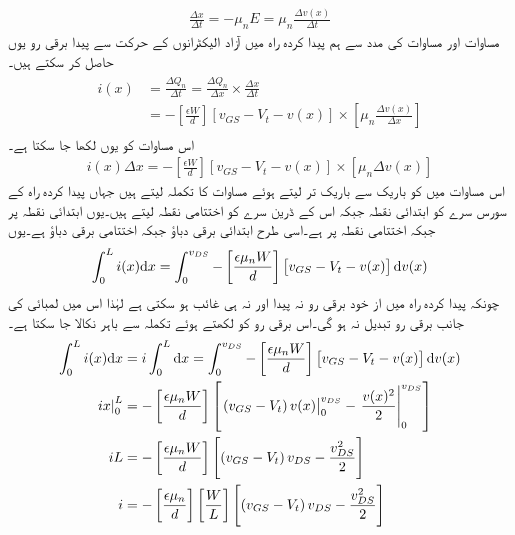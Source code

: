 \begin{align} \label{مساوات_میدانی_الیکٹران_کی_رفتار}
\frac{\Delta x}{\Delta t}=-\mu_n E=\mu_n \frac{\Delta v(x)}{\Delta t}
\end{align}
مساوات   اور مساوات   کی مدد سے ہم پیدا کردہ راہ میں آزاد الیکٹرانوں کے حرکت سے پیدا برقی رو یوں حاصل کر سکتے ہیں۔
\begin{gather}
\begin{aligned}
i(x)&=\frac{\Delta Q_n}{\Delta t}=\frac{\Delta Q_n}{\Delta x} \times \frac{\Delta x}{\Delta t}\\
&=-\left[\frac{\epsilon W}{d} \right ] \left[v_{GS}-V_t-v(x) \right ] \times \left [\mu_n \frac{\Delta v(x)}{\Delta x} \right ]
\end{aligned}
\end{gather}
اس مساوات کو یوں لکھا جا سکتا ہے۔
\begin{align}
i(x) \Delta x=-\left[\frac{\epsilon W}{d} \right ] \left[v_{GS}-V_t -v(x) \right] \times \left[\mu_n \Delta v(x) \right ]
\end{align}
اس مساوات میں  کو باریک سے باریک تر لیتے ہوئے مساوات کا تکملہ لیتے ہیں جہاں پیدا کردہ راہ کے سورس سرے کو ابتدائی نقطہ جبکہ اس کے ڈرین سرے کو اختتامی نقطہ لیتے ہیں۔یوں ابتدائی نقطہ پر    جبکہ اختتامی نقطہ پر   ہے۔اسی طرح ابتدائی برقی دباؤ   جبکہ اختتامی برقی دباؤ   ہے۔یوں
\begin{align}
\int_0^{L} {i(x)} \textup{d}x=\int_0^{v_{DS}}-\left[\frac{\epsilon \mu_n W}{d} \right ] \left[v_{GS}-V_t-v(x) \right ] \textup{d}v(x)
\end{align}
چونکہ پیدا کردہ راہ میں از خود برقی رو نہ پیدا اور نہ ہی غائب ہو سکتی ہے لہٰذا اس میں لمبائی کی جانب برقی رو تبدیل نہ ہو گی۔اس برقی رو کو  لکھتے ہوئے تکملہ سے باہر نکالا جا سکتا ہے۔
\begin{gather}
\begin{aligned}
\int_0^{L} {i(x) \textup{d}x}&=i \int_0^{L} {\textup{d}x}=\int_0^{v_{DS}}-\left[\frac{\epsilon \mu_n W}{d} \right ] \left[v_{GS}-V_t-v(x) \right ] \textup{d}v(x)\\
\left. ix \right |_0^{L}&=-\left[\frac{\epsilon \mu_n W}{d} \right ] \left [ \left . \left ( v_{GS} -V_t \right )v(x) \right |_0^{v_{DS}} -\left . \frac{v(x)^2}{2}  \right |_0^{v_{DS}}\right ]
\\
iL&=-\left[\frac{\epsilon \mu_n W}{d} \right ] \left[\left(v_{GS}-V_t \right ) v_{DS}-\frac{v_{DS}^{2}}{2} \right ]\\
i&=-\left[\frac{\epsilon \mu_n}{d} \right ] \left[\frac{W}{L} \right ] \left[ \left(v_{GS}-V_t \right ) v_{DS}-\frac{v_{DS}^{2}}{2}\right ]
\end{aligned}
\end{gather}
